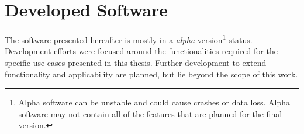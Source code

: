 \chapter[Developed Software]{Developed Software}
\label{append:software}
\renewcommand\bibname{References}
The software presented hereafter is mostly in a \textit{alpha}-version\footnote{Alpha software can be unstable and could cause crashes or data loss. Alpha software may not contain all of the features that are planned for the final version.} status.
Development efforts were focused around the functionalities required for the specific use cases presented in this thesis.
Further development to extend functionality and applicability are planned, but lie beyond the scope of this work.
	

\newpage

{\small
	
}
